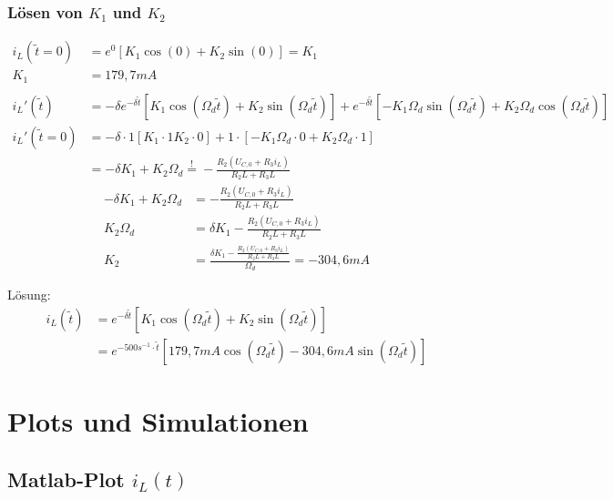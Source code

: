 \documentclass[11pt]{scrartcl}
\begin{document}
\subsubsection{Lösen von $K_1$ und $K_2$}%
\begin{align*}
  i_{L}(\tilde{t} = 0) &= e^{0} \left[ K_{1} \cos(0) + K_{2} \sin(0)\right] = K_{1} \\
  K_{1} &= 179,7 \unit{mA} \\ \\
  i_{L}'(\tilde{t}) &= -\delta e^{-\delta \tilde{t}} \left[ K_{1} \cos(\Omega_{d} \tilde{t}) + K_{2} \sin(\Omega_{d} \tilde{t})\right] + e^{-\delta \tilde{t}} \left[ -K_{1} \Omega_{d} \sin(\Omega_{d} \tilde{t}) + K_{2} \Omega_{d} \cos(\Omega_{d} \tilde{t})\right] \\
  i_{L}'(\tilde{t}=0) &= -\delta\cdot 1 \left[ K_{1}\cdot 1 K_{2} \cdot 0\right] + 1 \cdot \left[ -K_{1}\Omega_{d} \cdot 0 + K_{2} \Omega_{d} \cdot 1\right] \\
  &= -\delta K_{1} + K_{2}\Omega_{d} \overset{!}{=} - \frac{R_{2} (U_{C,0} + R_{3} i_{L})}{R_{2}L + R_{3}L}
\end{align*}
\begin{align*}
  -\delta K_{1} + K_{2}\Omega_{d} &= - \frac{R_{2} (U_{C,0} + R_{3} i_{L})}{R_{2}L + R_{3}L} \\
  K_{2}\Omega_{d} &= \delta K_{1} - \frac{R_{2}(U_{C,0} + R_{3}i_{L})}{R_{2}L + R_{3}L} \\
  K_{2} &= \frac{\delta K_{1} - \frac{R_{2}(U_{C,0} + R_{3} i_{L})}{R_{2}L + R_{3}L}}{\Omega_{d}} = -304,6 \unit{mA}
\end{align*}

Lösung:
\begin{align*}
  i_{L}(\tilde{t}) &= e^{-\delta \tilde{t}}\left[ K_{1} \cos(\Omega_{d} \tilde{t}) + K_{2} \sin(\Omega_{d} \tilde{t}) \right] \\
  &= e^{-500 s^{-1} \cdot  \tilde{t}}\left[ 179,7 \unit{mA} \cos(\Omega_{d} \tilde{t}) - 304,6 \unit{mA} \sin(\Omega_{d} \tilde{t}) \right]
\end{align*}
\section{Plots und Simulationen} %
\subsection{Matlab-Plot $i_L(t)$} %
\end{document}

